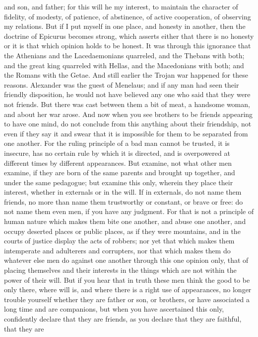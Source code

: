 \documentclass[a4paper]{article}
\begin{document}
and son, and father; for this will he my interest, to maintain the character of
fidelity, of modesty, of patience, of abstinence, of active cooperation, of
observing my relations. But if I put myself in one place, and honesty in
another, then the doctrine of Epicurus becomes strong, which asserts either
that there is no honesty or it is that which opinion holds to be honest.
    It was through this ignorance that the Athenians and the Lacedaemonians
quarreled, and the Thebans with both; and the great king quarreled with Hellas,
and the Macedonians with both; and the Romans with the Getae. And still earlier
the Trojan war happened for these reasons. Alexander was the guest of Menelaus;
and if any man had seen their friendly disposition, he would not have believed
any one who said that they were not friends. But there was cast between them a
bit of meat, a handsome woman, and about her war arose. And now when you see
brothers to be friends appearing to have one mind, do not conclude from this
anything about their friendship, not even if they say it and swear that it is
impossible for them to be separated from one another. For the ruling principle
of a bad man cannot be trusted, it is insecure, has no certain rule by which it
is directed, and is overpowered at different times by different appearances.
But examine, not what other men examine, if they are born of the same parents
and brought up together, and under the same pedagogue; but examine this only,
wherein they place their interest, whether in externals or in the will. If in
externals, do not name them friends, no more than name them trustworthy or
constant, or brave or free: do not name them even men, if you have any
judgment. For that is not a principle of human nature which makes them bite one
another, and abuse one another, and occupy deserted places or public places, as
if they were mountains, and in the courts of justice display the acts of
robbers; nor yet that which makes them intemperate and adulterers and
corrupters, nor that which makes them do whatever else men do against one
another through this one opinion only, that of placing themselves and their
interests in the things which are not within the power of their will. But if
you hear that in truth these men think the good to be only there, where will
is, and where there is a right use of appearances, no longer trouble yourself
whether they are father or son, or brothers, or have associated a long time and
are companions, but when you have ascertained this only, confidently declare
that they are friends, as you declare that they are faithful, that they are
\end{document}
